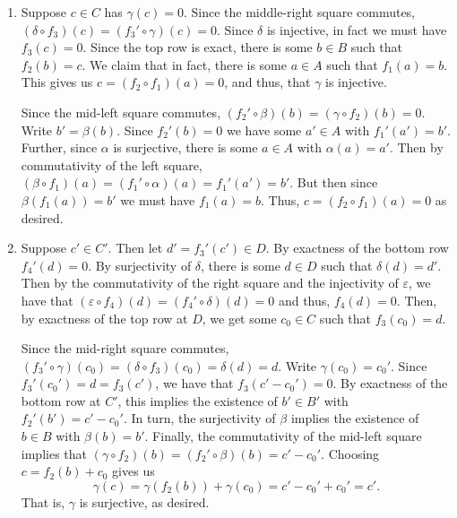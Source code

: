 \documentclass[12 pt, letterpaper]{hmcpset}
\begin{document}
\begin{solution}
	\begin{enumerate}
		\item Suppose $c \in C$ has $\gamma(c) = 0$. Since the middle-right square commutes, $(\delta \circ f_{3})(c) = (f_{3}' \circ \gamma)(c) = 0$. Since $\delta$ is injective, in fact we must have $f_{3}(c) = 0$. Since the top row is exact, there is some $b \in B$ such that $f_{2}(b) = c$. We claim that in fact, there is some $a \in A$ such that $f_{1}(a) = b$. This gives us $c = (f_{2} \circ f_{1})(a) = 0$, and thus, that $\gamma$ is injective.

			Since the mid-left square commutes, $(f_{2}' \circ \beta)(b) = (\gamma \circ f_{2})(b) = 0$. Write $b' = \beta(b)$. Since $f_{2}'(b) = 0$ we have some $a' \in A$ with $f_{1}'(a') = b'$. Further, since $\alpha$ is surjective, there is some $a \in A$ with $\alpha(a) = a'$. Then by commutativity of the left square, $(\beta \circ f_{1})(a) = (f_{1}' \circ \alpha)(a) = f_{1}'(a') = b'$. But then since $\beta(f_{1}(a)) = b'$ we must have $f_{1}(a) = b$. Thus, $c = (f_{2} \circ f_{1})(a) = 0$ as desired.
		\item Suppose $c' \in C'$. Then let $d' = f_{3}'(c') \in D$. By exactness of the bottom row $f_{4}'(d) = 0$. By surjectivity of $\delta$, there is some $d \in D$ such that $\delta(d) = d'$. Then by the commutativity of the right square and the injectivity of $\varepsilon$, we have that $(\varepsilon \circ f_{4})(d) = (f_{4}' \circ \delta)(d) = 0$ and thus, $f_{4}(d) = 0$. Then, by exactness of the top row at $D$, we get some $c_{0} \in C$ such that $f_{3}(c_{0}) = d$.

			Since the mid-right square commutes, $(f_{3}' \circ \gamma)(c_{0}) = (\delta \circ f_{3})(c_{0}) = \delta(d) = d$. Write $\gamma(c_{0}) = c_{0}'$. Since $f_{3}'(c_{0}') = d = f_{3}(c')$, we have that $f_{3}(c' - c_{0}') = 0$. By exactness of the bottom row at $C'$, this implies the existence of $b' \in B'$ with $f_{2}'(b') = c' - c_{0}'$. In turn, the surjectivity of $\beta$ implies the existence of $b \in B$ with $\beta(b) = b'$. Finally, the commutativity of the mid-left square implies that $(\gamma \circ f_{2})(b) = (f_{2}' \circ \beta)(b) = c' - c_{0}'$. Choosing $c = f_{2}(b) + c_{0}$ gives us
			\[
				\gamma(c) = \gamma(f_{2}(b)) + \gamma(c_{0}) = c' - c_{0}' + c_{0}' = c'.
			\]
			That is, $\gamma$ is surjective, as desired.
	\end{enumerate}
\end{solution}
\end{document}
